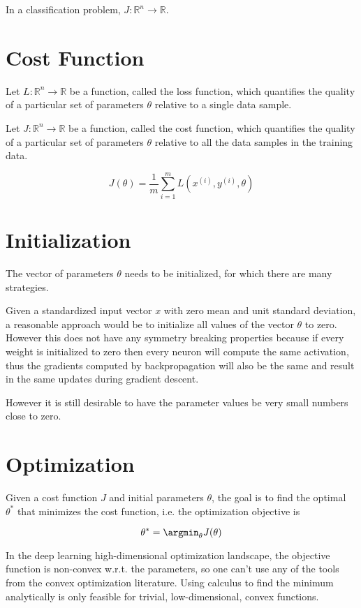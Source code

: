 In a classification problem, $J \colon \mathbb{R}^n \to \mathbb{R}$.

\section{Cost Function}

Let $L \colon \mathbb{R}^n \to \mathbb{R}$ be a function, called the loss function, which quantifies the quality of a particular set of parameters $\theta$ relative to a single data sample.

Let $J \colon \mathbb{R}^n \to \mathbb{R}$ be a function, called the cost function, which quantifies the quality of a particular set of parameters $\theta$ relative to all the data samples in the training data.

$$
J(\theta) = \frac{1}{m} \sum_{i=1}^{m} L(x^{(i)}, y^{(i)}, \theta)
$$

\section{Initialization}

The vector of parameters $\theta$ needs to be initialized, for which there are many strategies.

Given a standardized input vector $x$ with zero mean and unit standard deviation, a reasonable approach would be to initialize all values of the vector $\theta$ to zero. However this does not have any symmetry breaking properties because if every weight is initialized to zero then every neuron will compute the same activation, thus the gradients computed by backpropagation will also be the same and result in the same updates during gradient descent.

However it is still desirable to have the parameter values be very small numbers close to zero.



\section{Optimization}

Given a cost function $J$ and initial parameters $\theta$, the goal is to find the optimal $\theta^*$ that minimizes the cost function, i.e. the optimization objective is 

$$
\theta^* = \argmin_{\theta} J(\theta)
$$

In the deep learning high-dimensional optimization landscape, the objective function is non-convex w.r.t. the parameters, so one can't use any of the tools from the convex optimization literature. Using calculus to find the minimum analytically is only feasible for trivial, low-dimensional, convex functions.

